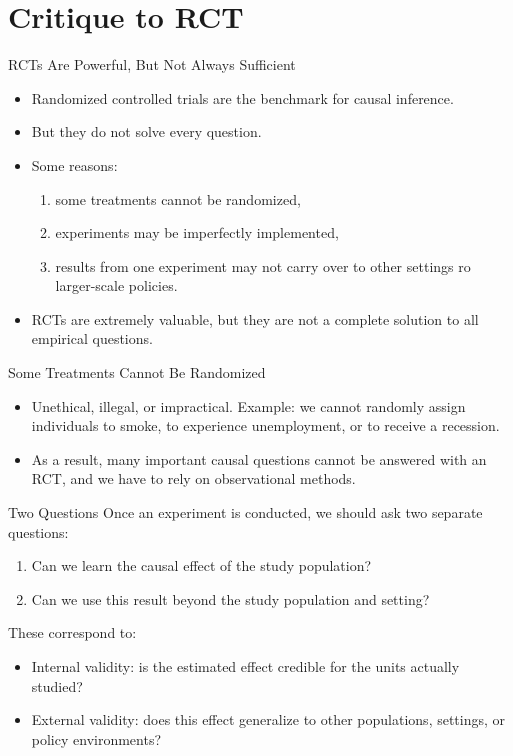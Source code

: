 \documentclass[11pt,aspectratio=169]{beamer}
\begin{document}
\section{Critique to RCT}
\begin{frame}{RCTs Are Powerful, But Not Always Sufficient}
\begin{itemize}
  \item Randomized controlled trials are the benchmark for causal inference.
  \item But they do not solve every question.
  \item Some reasons:
\begin{enumerate}
  \item some treatments cannot be randomized,
  \item experiments may be imperfectly implemented,
  \item results from one experiment may not carry over to other settings ro larger-scale policies.
\end{enumerate}
\item RCTs are extremely valuable, but they are not a complete solution to all empirical questions.
\end{itemize}

\end{frame}
\begin{frame}{Some Treatments Cannot Be Randomized}
\begin{itemize}
  \item Unethical, illegal, or impractical. Example: we cannot randomly assign individuals to smoke, to experience unemployment, or to receive a recession.
  \item As a result, many important causal questions cannot be answered with an RCT, and we have to rely on observational methods.
\end{itemize}




\end{frame}
\begin{frame}{Two Questions}
Once an experiment is conducted, we should ask two separate questions:
\begin{enumerate}
  \item Can we learn the causal effect of the study population?
  \item Can we use this result beyond the study population and setting?

\end{enumerate}

These correspond to:
\begin{itemize}
  \item Internal validity: is the estimated effect credible for the units actually studied?
  \item External validity: does this effect generalize to other populations, settings, or policy environments?
\end{itemize}

\end{frame}
\end{document}
